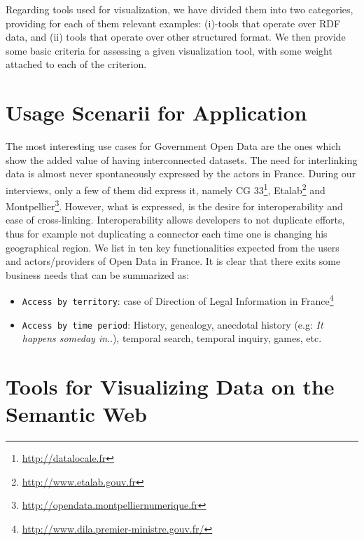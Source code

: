 \documentclass[a4paper,11pt]{report}
\begin{document}
Regarding tools used for visualization, we have divided them into two categories, providing for each of them relevant examples: (i)-tools that operate over RDF data, and (ii) tools that operate over other structured format. We then provide some basic criteria for assessing a given visualization tool, with some weight attached to each of the criterion. 


 \section{Usage Scenarii for Application}
 The most interesting use cases for Government Open Data are the ones which show the added value of having interconnected datasets. The need for interlinking data is almost never spontaneously expressed by the actors in France. During our interviews, only a few of them did express it, namely CG 33\footnote{\url{http://datalocale.fr}}, Etalab\footnote{\url{http://www.etalab.gouv.fr}} and Montpellier\footnote{\url{http://opendata.montpelliernumerique.fr}}. However, what is expressed, is the desire for interoperability and ease of cross-linking. Interoperability allows developers to not duplicate efforts, thus for example not duplicating a connector each time one is changing his geographical region. We list in \cite{deliverable2012a} ten key functionalities expected from the users and actors/providers of Open Data in France. It is clear that there exits some business needs that can be summarized as:
\begin{itemize}
\item \texttt{Access by territory}: case of Direction of Legal Information in France\footnote{\url{http://www.dila.premier-ministre.gouv.fr/}}
\item \texttt{Access by time period}: History, genealogy, anecdotal history (e.g: \textit{It happens someday in}..), temporal search, temporal inquiry, games, etc.
\end{itemize}
 


\section{Tools for Visualizing Data on the Semantic Web}
 
\end{document}
